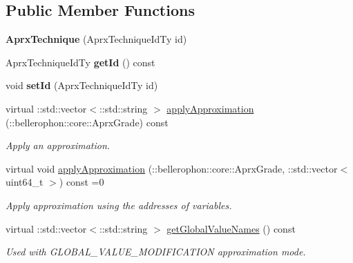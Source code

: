 \subsection*{Public Member Functions}
\begin{DoxyCompactItemize}
\item 
\hypertarget{classbellerophon_1_1core_1_1AprxTechnique_ac495163cbd5c3479a425650f6a3c0371}{}\label{classbellerophon_1_1core_1_1AprxTechnique_ac495163cbd5c3479a425650f6a3c0371} 
{\bfseries Aprx\+Technique} (Aprx\+Technique\+Id\+Ty id)
\item 
\hypertarget{classbellerophon_1_1core_1_1AprxTechnique_a3afc9a467f5211a83d68b96014eff290}{}\label{classbellerophon_1_1core_1_1AprxTechnique_a3afc9a467f5211a83d68b96014eff290} 
Aprx\+Technique\+Id\+Ty {\bfseries get\+Id} () const
\item 
\hypertarget{classbellerophon_1_1core_1_1AprxTechnique_a655d22746c4cbe25f99599de1a299ff7}{}\label{classbellerophon_1_1core_1_1AprxTechnique_a655d22746c4cbe25f99599de1a299ff7} 
void {\bfseries set\+Id} (Aprx\+Technique\+Id\+Ty id)
\item 
virtual \+::std\+::vector$<$\+::std\+::string $>$ \hyperlink{classbellerophon_1_1core_1_1AprxTechnique_a834c99b86f8f9cdd1f411c685b36a275}{apply\+Approximation} (\+::bellerophon\+::core\+::\+Aprx\+Grade) const
\begin{DoxyCompactList}\small\item\em Apply an approximation. \end{DoxyCompactList}\item 
\hypertarget{classbellerophon_1_1core_1_1AprxTechnique_a797384b5484b0277f5268bbf4e23aa7c}{}\label{classbellerophon_1_1core_1_1AprxTechnique_a797384b5484b0277f5268bbf4e23aa7c} 
virtual void \hyperlink{classbellerophon_1_1core_1_1AprxTechnique_a797384b5484b0277f5268bbf4e23aa7c}{apply\+Approximation} (\+::bellerophon\+::core\+::\+Aprx\+Grade, \+::std\+::vector$<$ uint64\+\_\+t $>$) const =0
\begin{DoxyCompactList}\small\item\em Apply approximation using the addresses of variables. \end{DoxyCompactList}\item 
virtual \+::std\+::vector$<$\+::std\+::string $>$ \hyperlink{classbellerophon_1_1core_1_1AprxTechnique_a5d78bfe611a2e1884fd66f06ccde84d7}{get\+Global\+Value\+Names} () const
\begin{DoxyCompactList}\small\item\em Used with G\+L\+O\+B\+A\+L\+\_\+\+V\+A\+L\+U\+E\+\_\+\+M\+O\+D\+I\+F\+I\+C\+A\+T\+I\+ON approximation mode. \end{DoxyCompactList}\item 

\end{DoxyCompactItemize}
